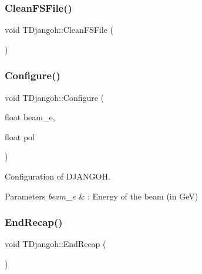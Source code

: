 \mbox{\label{class_t_djangoh_ade1e9ff8b29d2b95d24a22c3474a7ba6}} 
\subsubsection{\texorpdfstring{Clean\+F\+S\+File()}{CleanFSFile()}}
{\footnotesize\ttfamily void T\+Djangoh\+::\+Clean\+F\+S\+File (\begin{DoxyParamCaption}{ }\end{DoxyParamCaption})\hspace{0.3cm}{\ttfamily [inline]}}

\mbox{\label{class_t_djangoh_af58a4c6bb944a4ce79cc538829e490e8}} 
\subsubsection{\texorpdfstring{Configure()}{Configure()}}
{\footnotesize\ttfamily void T\+Djangoh\+::\+Configure (\begin{DoxyParamCaption}\item[{float}]{beam\+\_\+e,  }\item[{float}]{pol }\end{DoxyParamCaption})}



Configuration of D\+J\+A\+N\+G\+OH. 


\begin{DoxyParams}{Parameters}
{\em beam\+\_\+e} & \+: Energy of the beam (in GeV) \\
\hline
\end{DoxyParams}
\mbox{\label{class_t_djangoh_a076cac82063ed8740ac0a32e77c02c94}} 
\subsubsection{\texorpdfstring{End\+Recap()}{EndRecap()}}
{\footnotesize\ttfamily void T\+Djangoh\+::\+End\+Recap (\begin{DoxyParamCaption}{ }\end{DoxyParamCaption})}



